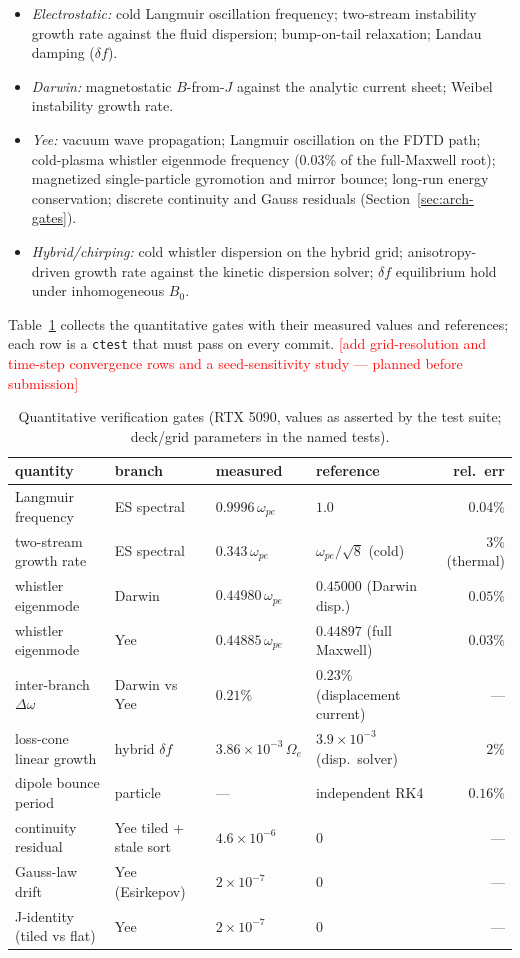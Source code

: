 \documentclass[11pt]{article}
\newcommand{\tocheck}[1]{\textcolor{red}{[#1]}}
\begin{document}
\begin{itemize}
\item \emph{Electrostatic:} cold Langmuir oscillation frequency;
  two-stream instability growth rate against the fluid dispersion;
  bump-on-tail relaxation; Landau damping ($\delta f$).
\item \emph{Darwin:} magnetostatic $B$-from-$J$ against the analytic
  current sheet; Weibel instability growth rate.
\item \emph{Yee:} vacuum wave propagation; Langmuir oscillation on the
  FDTD path; cold-plasma whistler eigenmode frequency (0.03\% of the
  full-Maxwell root); magnetized single-particle gyromotion and mirror
  bounce; long-run energy conservation; discrete continuity and Gauss
  residuals (Section~\ref{sec:arch-gates}).
\item \emph{Hybrid/chirping:} cold whistler dispersion on the hybrid
  grid; anisotropy-driven growth rate against the kinetic dispersion
  solver; $\delta f$ equilibrium hold under inhomogeneous $B_0$.
\end{itemize}

Table~\ref{tab:verify} collects the quantitative gates with their
measured values and references; each row is a \texttt{ctest} that
must pass on every commit.
\tocheck{add grid-resolution and time-step convergence rows and a
seed-sensitivity study --- planned before submission}

\begin{table}[htbp]
\centering
\caption{Quantitative verification gates (RTX 5090, values as asserted
by the test suite; deck/grid parameters in the named tests).}
\label{tab:verify}
\small
\begin{tabular}{llllr}
\toprule
quantity & branch & measured & reference & rel.\ err\\
\midrule
Langmuir frequency & ES spectral & $0.9996\,\omega_{pe}$ & $1.0$ & $0.04\%$\\
two-stream growth rate & ES spectral & $0.343\,\omega_{pe}$ & $\omega_{pe}/\sqrt8$ (cold) & $3\%$ (thermal)\\
whistler eigenmode & Darwin & $0.44980\,\omega_{pe}$ & $0.45000$ (Darwin disp.) & $0.05\%$\\
whistler eigenmode & Yee & $0.44885\,\omega_{pe}$ & $0.44897$ (full Maxwell) & $0.03\%$\\
inter-branch $\Delta\omega$ & Darwin vs Yee & $0.21\%$ & $0.23\%$ (displacement current) & ---\\
loss-cone linear growth & hybrid $\delta f$ & $3.86\times10^{-3}\,\Omega_e$ & $3.9\times10^{-3}$ (disp.\ solver) & $2\%$\\
dipole bounce period & particle & --- & independent RK4 & $0.16\%$\\
continuity residual & Yee tiled + stale sort & $4.6\times10^{-6}$ & $0$ & ---\\
Gauss-law drift & Yee (Esirkepov) & $2\times10^{-7}$ & $0$ & ---\\
J-identity (tiled vs flat) & Yee & $2\times10^{-7}$ & $0$ & ---\\
\bottomrule
\end{tabular}
\end{table}
\end{document}
